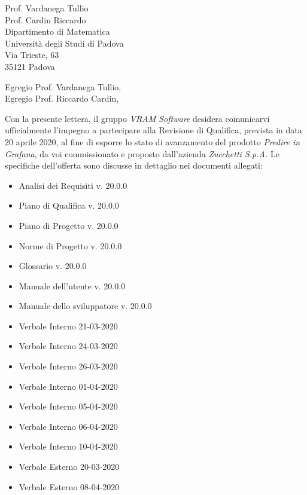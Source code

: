 \documentclass[a4paper,12pt]{letteracdp}
\date{13 aprile 2020}
\begin{document}
\begin{letter}{
		Prof. Vardanega Tullio \\
		Prof. Cardin Riccardo \\
		Dipartimento di Matematica \\
		Università degli Studi di Padova \\
		Via Trieste, 63 \\
		35121 Padova}
	
	\opening{Egregio Prof. Vardanega Tullio, \\ \noindent Egregio Prof. Riccardo Cardin,}
	
	\begin{flushleft}
	Con la presente lettera, il gruppo \textit{VRAM Software} desidera comunicarvi ufficialmente l'impegno a partecipare alla Revisione di Qualifica, prevista in data 20 aprile 2020, al fine di esporre lo stato di avanzamento del prodotto \textit{Predire in Grafana}, da voi commissionato e proposto dall'azienda \textit{Zucchetti S.p.A.}
	Le specifiche dell'offerta sono discusse in dettaglio nei documenti allegati: \\ 
	\end{flushleft}

	\begin{itemize}
		\item Analisi dei Requisiti v. 20.0.0
		\item Piano di Qualifica v. 20.0.0
		\item Piano di Progetto v. 20.0.0
		\item Norme di Progetto v. 20.0.0
		\item Glossario v. 20.0.0
		
		\item Manuale dell'utente v. 20.0.0
		\item Manuale dello sviluppatore v. 20.0.0
		
		\item Verbale Interno 21-03-2020 
		\item Verbale Interno 24-03-2020 
		\item Verbale Interno 26-03-2020 
		\item Verbale Interno 01-04-2020 
		\item Verbale Interno 05-04-2020 
		\item Verbale Interno 06-04-2020 
		\item Verbale Interno 10-04-2020 
		
		\item Verbale Esterno 20-03-2020 
		\item Verbale Esterno 08-04-2020 
	\end{itemize}



\end{letter}
\end{document}
